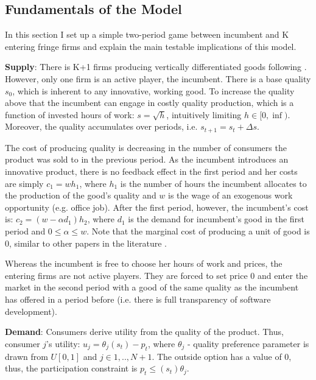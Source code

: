 \documentclass{article}
\numberwithin{figure}{section}
\numberwithin{table}{section}
\theoremstyle{indented}
\numberwithin{equation}{section} %
\begin{document}
\subsection{Fundamentals of the Model} \label{model}
 
 In this section I set up a simple two-period game between incumbent and K entering fringe firms and explain the main testable implications of this model.

\textbf{Supply}:
There is K+1 firms producing vertically differentiated goods following  \citet{Tirole}. However, only one firm is an active player, the incumbent. There is a base quality $s_0$, which is inherent to any innovative, working good. To increase the quality above that the incumbent can engage in costly quality production, which is a function of invested hours of work: $s=\sqrt{h}$, intuitively limiting $h \in [0,\inf)$. Moreover, the quality accumulates over periods, i.e. $s_{t+1}=s_{t}+\Delta s$. 

The cost of producing quality is decreasing in the number of consumers the product was sold to in the previous period. As the incumbent introduces an innovative product, there is no feedback effect in the first period and her costs are simply $c_1= wh_1$, where $h_1$ is the number of hours the incumbent allocates to the production of the good's quality and $w$ is the wage of an exogenous work opportunity (e.g. office job). After the first period, however, the incumbent's cost is: $c_2= (w-\alpha d_1)h_2$, where $d_1$ is the demand for incumbent's good in the first period and $0\leq \alpha \leq w$. Note that the marginal cost of producing a unit of good is 0, similar to other papers in the literature \citep{Ajorlou2018}. 

Whereas the incumbent is free to choose her hours of work and prices, the entering firms are not active players.  They are forced to set price 0 and enter the market in the second period with a good of the same quality as the incumbent has offered in a period before (i.e. there is full transparency of software development). 

\textbf{Demand}: 
Consumers derive utility from the quality of the product. Thus, consumer $j$'s utility: $u_j = \theta_j(s_t) - p_t$, where $\theta_j$ - quality preference parameter is drawn from $U[0,1]$ and $j\in{1,..,N+1}$. The outside option has a value of 0, thus, the participation constraint is $p_t\leq (s_t) \theta_j$. 
\end{document}
